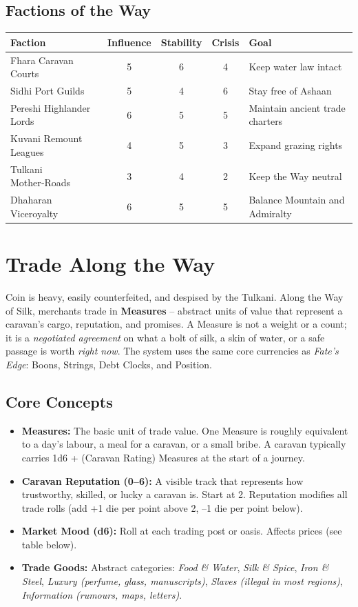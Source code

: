 \documentclass[11pt]{book}
\begin{document}
\section{Factions of the Way}
\begin{tabu} to \linewidth {|X|c|c|c|X|}
\hline
\textbf{Faction} & \textbf{Influence} & \textbf{Stability} & \textbf{Crisis} & \textbf{Goal} \\
\hline
Fhara Caravan Courts & 5 & 6 & 4 & Keep water law intact \\
Sidhi Port Guilds & 5 & 4 & 6 & Stay free of Ashaan \\
Pereshi Highlander Lords & 6 & 5 & 5 & Maintain ancient trade charters \\
Kuvani Remount Leagues & 4 & 5 & 3 & Expand grazing rights \\
Tulkani Mother‑Roads & 3 & 4 & 2 & Keep the Way neutral \\
Dhaharan Viceroyalty & 6 & 5 & 5 & Balance Mountain and Admiralty \\
\hline
\end{tabu}

\clearpage
\chapter{Trade Along the Way}
\label{chap:trade}

Coin is heavy, easily counterfeited, and despised by the Tulkani. Along the Way of Silk, merchants trade in \textbf{Measures} – abstract units of value that represent a caravan’s cargo, reputation, and promises. A Measure is not a weight or a count; it is a \textit{negotiated agreement} on what a bolt of silk, a skin of water, or a safe passage is worth \textit{right now}. The system uses the same core currencies as \textit{Fate's Edge}: Boons, Strings, Debt Clocks, and Position.

\section{Core Concepts}

\begin{itemize}
    \item \textbf{Measures:} The basic unit of trade value. One Measure is roughly equivalent to a day’s labour, a meal for a caravan, or a small bribe. A caravan typically carries 1d6 + (Caravan Rating) Measures at the start of a journey.
    \item \textbf{Caravan Reputation (0–6):} A visible track that represents how trustworthy, skilled, or lucky a caravan is. Start at 2. Reputation modifies all trade rolls (add +1 die per point above 2, –1 die per point below).
    \item \textbf{Market Mood (d6):} Roll at each trading post or oasis. Affects prices (see table below).
    \item \textbf{Trade Goods:} Abstract categories: \textit{Food \& Water}, \textit{Silk \& Spice}, \textit{Iron \& Steel}, \textit{Luxury (perfume, glass, manuscripts)}, \textit{Slaves (illegal in most regions)}, \textit{Information (rumours, maps, letters)}.
\end{itemize}
\end{document}
